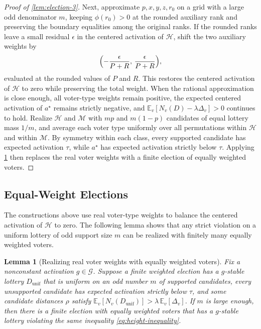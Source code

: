 \documentclass[11pt]{article}
\numberwithin{equation}{section}
\theoremstyle{plain}
\newtheorem{lemma}[theorem]{Lemma}
\theoremstyle{definition}
\newcommand{\E}{\mathbb{E}}
\newcommand{\1}{\mathbf{1}}
\newcommand{\calG}{\mathcal{G}}
\newcommand{\calH}{\mathcal{H}}
\newcommand{\calM}{\mathcal{M}}
\begin{document}
\begin{proof}[Proof of {\cref{lem:election-3}}]
Next, approximate $p,x,y,z,r_0$ on a grid with a large odd denominator $m$, keeping $\phi(r_0)>0$ at the rounded auxiliary rank and preserving the boundary equalities among the original ranks. If the rounded ranks leave a small residual $\epsilon$ in the centered activation of $\calH$, shift the two auxiliary weights by
\[
  \Bigl(-\frac{\epsilon}{P + R},\, \frac{\epsilon}{P + R}\Bigr),
\]
evaluated at the rounded values of $P$ and $R$. This restores the centered activation of $\calH$ to zero while preserving the total weight. When the rational approximation is close enough, all voter-type weights remain positive, the expected centered activation of $a^\star$ remains strictly negative, and $\E_v[N_v(D) - \lambda\Delta_v] > 0$ continues to hold. Realize $\calH$ and $\calM$ with $m p$ and $m(1 - p)$ candidates of equal lottery mass $1/m$, and average each voter type uniformly over all permutations within $\calH$ and within $\calM$. By symmetry within each class, every supported candidate has expected activation $\tau$, while $a^\star$ has expected activation strictly below $\tau$. Applying \cref{lem:equal-weights} then replaces the real voter weights with a finite election of equally weighted voters.
\end{proof}

\subsection{Equal-Weight Elections}
\label{app:equal-weights}

The constructions above use real voter-type weights to balance the centered activation of $\calH$ to zero. The following lemma shows that any strict violation on a uniform lottery of odd support size $m$ can be realized with finitely many equally weighted voters.

\begin{lemma}[Realizing real voter weights with equally weighted voters]
\label{lem:equal-weights}
Fix a nonconstant activation $g \in \calG$. Suppose a finite weighted election has a $g$-stable lottery $D_{\mathrm{unif}}$ that is uniform on an odd number $m$ of supported candidates, every unsupported candidate has expected activation strictly below $\tau$, and some candidate distances $\rho$ satisfy $\E_v[N_v(D_{\mathrm{unif}})] > \lambda\,\E_v[\Delta_v]$. If $m$ is large enough, then there is a finite election with equally weighted voters that has a $g$-stable lottery violating the same inequality \cref{eq:height-inequality}.
\end{lemma}
\end{document}
